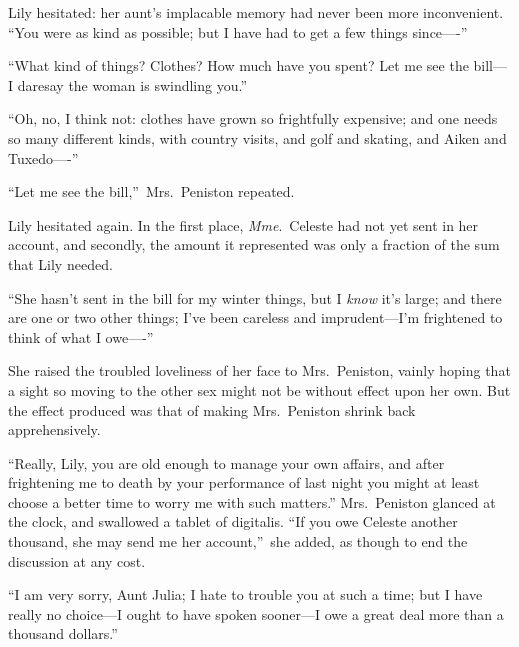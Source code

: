 \documentclass[12pt,a4paper]{book}
\begin{document}
Lily hesitated: her aunt's implacable memory had never been more
inconvenient. ``You were as kind as possible; but I have had to
get a few things since----''





``What kind of things? Clothes? How much have you spent? Let me
see the bill---I daresay the woman is swindling you.''





``Oh, no, I think not: clothes have grown so frightfully
expensive; and one needs so many different kinds, with country
visits, and golf and skating, and Aiken and Tuxedo----''





``Let me see the bill,''\ Mrs.\ Peniston repeated.





Lily hesitated again. In the first place, \textit{Mme}.\ Celeste had not
yet sent in her account, and secondly, the amount it represented
was only a fraction of the sum that Lily needed.





``She hasn't sent in the bill for my winter things, but I \textit{know}
it's large; and there are one or two other things; I've been
careless and imprudent---I'm frightened to think of what I owe----''





She raised the troubled loveliness of her face to Mrs.\ Peniston,
vainly hoping that a sight so moving to the other sex might not
be without effect upon her own. But the effect produced was that
of making Mrs.\ Peniston shrink back apprehensively.





``Really, Lily, you are old enough to manage your own affairs, and
after frightening me to death by your performance of last night
you might at least choose a better time to worry me with such
matters.'' Mrs.\ Peniston glanced at the clock, and swallowed a
tablet of digitalis. ``If you owe Celeste another
thousand, she may send me her account,''\ she added, as though to
end the discussion at any cost.





``I am very sorry, Aunt Julia; I hate to trouble you at such a
time; but I have really no choice---I ought to have spoken
sooner---I owe a great deal more than a thousand dollars.''
\end{document}
